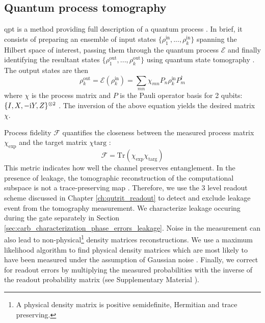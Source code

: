 \subsection{Quantum process tomography}
\gls{qpt} is a method providing full description of a quantum process \cite{Chuang1997PrescriptionBox, Poyatos1997CompleteGate}. In brief, it consists of preparing an ensemble of input states $\{\rho_1^\mathrm{in}, ..., \rho_k^\mathrm{in}\}$ spanning the Hilbert space of interest, passing them through the quantum process $\mathcal{E}$ and finally identifying the resultant states  $\{\rho_1^\mathrm{out}, ..., \rho_k^\mathrm{out}\}$ using quantum state tomography \cite{Reed2013EntanglementQubits}. The output states are then
\begin{equation}
    \rho_k^{\mathrm{out}} = \mathcal{E}(\rho_k^\mathrm{in}) = \sum_{m n} \chi_{m n} P_n \rho_k^\mathrm{in} P_m^\dag
\end{equation}
 where $\chi$ is the process matrix and $P$ is the Pauli operator basis for 2 qubits: $\{I, X, -\mathrm i Y, Z\}^{\otimes 2}$ \cite{HeinsooDigitalQubits}. The inversion of the above equation yields the desired matrix $\chi$. 
 
Process fidelity $\mathcal{F}$ quantifies the closeness between the measured process matrix $\chi_\mathrm{exp}$ and the target matrix $\chi\mathrm{targ}$ \cite{Schumacher1996SendingChannels}: 
 \begin{equation}
     \mathcal{F} = \mathrm{Tr}(\chi_\mathrm{exp} \chi_\mathrm{targ})
 \end{equation}
This metric indicates how well the channel preserves entanglement.
In the presence of leakage, the tomographic reconstruction of the computational subspace is not a trace-preserving map \cite{Wood2018QuantificationErrors}. Therefore, we use the 3 level readout scheme discussed in Chapter \ref{ch:qutrit_readout} to detect and exclude leakage event from the tomography measurement. We characterize leakage occuring during the gate separately in Section \ref{sec:carb_characterization_phase_errors_leakage}. 
Noise in the measurement can also lead to non-physical\footnote{A physical density matrix is positive semidefinite, Hermitian and trace preserving.} density matrices reconstructions. We use a maximum likelihood algorithm to find physical density matrices which are most likely to have been measured under the assumption of Gaussian noise \cite{BaurRealizingQubits}. 
Finally, we correct for readout errors by multiplying the measured probabilities with the inverse of the readout probability matrix (see Supplementary Material \cite{Bialczak2010QuantumQubits}).

